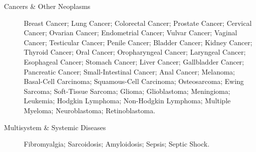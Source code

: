 \begin{description}
\item[Cancers \& Other Neoplasms] Breast Cancer; Lung Cancer; Colorectal Cancer; Prostate Cancer; Cervical Cancer; Ovarian Cancer; Endometrial Cancer; Vulvar Cancer; Vaginal Cancer; Testicular Cancer; Penile Cancer; Bladder Cancer; Kidney Cancer; Thyroid Cancer; Oral Cancer; Oropharyngeal Cancer; Laryngeal Cancer; Esophageal Cancer; Stomach Cancer; Liver Cancer; Gallbladder Cancer; Pancreatic Cancer; Small-Intestinal Cancer; Anal Cancer; Melanoma; Basal-Cell Carcinoma; Squamous-Cell Carcinoma; Osteosarcoma; Ewing Sarcoma; Soft-Tissue Sarcoma; Glioma; Glioblastoma; Meningioma; Leukemia; Hodgkin Lymphoma; Non-Hodgkin Lymphoma; Multiple Myeloma; Neuroblastoma; Retinoblastoma.

\item[Multisystem \& Systemic Diseases] Fibromyalgia; Sarcoidosis; Amyloidosis; Sepsis; Septic Shock.
\end{description}
